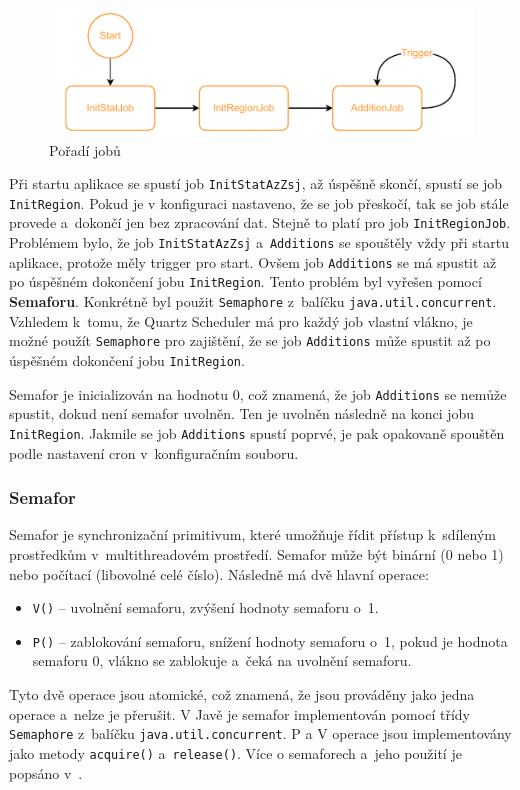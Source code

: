 \newpage

\begin{figure}[!h]
    \label{fig:jobs_scheduled}
    \caption{Pořadí jobů}
    \centering
    \includegraphics[width=\textwidth]{figures/jobs_scheduled.pdf}
\end{figure}

Při startu aplikace se spustí job \texttt{InitStatAzZsj}, až úspěšně skončí,
spustí se job \texttt{InitRegion}. Pokud je v konfiguraci nastaveno, že se job
přeskočí, tak se job stále provede a~dokončí jen bez zpracování dat.
Stejně to platí pro job \texttt{InitRegionJob}.
Problémem bylo, že job \texttt{InitStatAzZsj} a~\texttt{Additions}
se spouštěly vždy při startu aplikace, protože měly trigger pro start.
Ovšem job \texttt{Additions} se má spustit až po úspěšném dokončení jobu
\texttt{InitRegion}. Tento problém byl vyřešen pomocí \textbf{Semaforu}.
Konkrétně byl použit \texttt{Semaphore} z~balíčku \texttt{java.util.concurrent}.
Vzhledem k~tomu, že Quartz Scheduler má pro každý job vlastní vlákno,
je možné použít \texttt{Semaphore} pro zajištění, že se job \texttt{Additions}
může spustit až po úspěšném dokončení jobu \texttt{InitRegion}.

Semafor je inicializován na hodnotu 0, což znamená, že job \texttt{Additions}
se nemůže spustit, dokud není semafor uvolněn. Ten je uvolněn následně na konci
jobu \texttt{InitRegion}. Jakmile se job \texttt{Additions} spustí poprvé, je pak
opakovaně spouštěn podle nastavení cron v~konfiguračním souboru.

\subsubsection*{Semafor}
Semafor je synchronizační primitivum, které umožňuje řídit přístup
k~sdíleným prostředkům v~multithreadovém prostředí.
Semafor může být binární (0 nebo 1) nebo počítací (libovolné celé číslo).
Následně má dvě hlavní operace:
\begin{itemize}
    \item \texttt{V()} -- uvolnění semaforu, zvýšení hodnoty semaforu o~1.
    \item \texttt{P()} -- zablokování semaforu, snížení hodnoty semaforu o~1, pokud je hodnota semaforu 0, vlákno se zablokuje a~čeká na uvolnění semaforu.
\end{itemize}

Tyto dvě operace jsou atomické, což znamená, že jsou prováděny jako jedna operace a~nelze je přerušit.
V Javě je semafor implementován pomocí třídy \texttt{Semaphore} z~balíčku \texttt{java.util.concurrent}.
P a V operace jsou implementovány jako metody \texttt{acquire()} a~\texttt{release()}.
Více o semaforech a~jeho použití je popsáno v~\cite{pesicka_semafor}.


